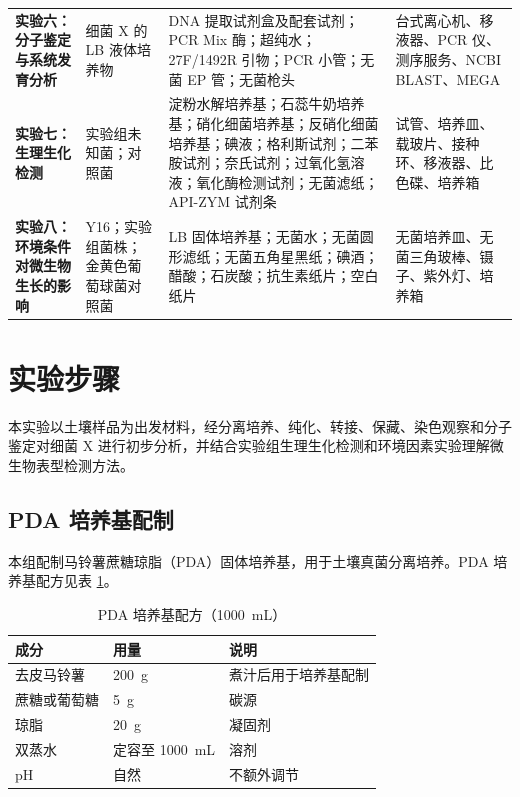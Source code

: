 \documentclass[UTF8,a4paper,12pt,fontset=none]{ctexart}
\numberwithin{figure}{section}
\begin{document}
\begin{longtable}{@{}C{0.12\textwidth}C{0.18\textwidth}C{0.35\textwidth}C{0.25\textwidth}@{}}
    \textbf{实验六：分子鉴定与系统发育分析}
    & 细菌 X 的 LB 液体培养物
    & DNA 提取试剂盒及配套试剂；PCR Mix 酶；超纯水；27F/1492R 引物；PCR 小管；无菌 EP 管；无菌枪头
    & 台式离心机、移液器、PCR 仪、测序服务、NCBI BLAST、MEGA \\
    \addlinespace[0.45em]
    \midrule

    \textbf{实验七：生理生化检测}
    & 实验组未知菌；对照菌
    & 淀粉水解培养基；石蕊牛奶培养基；硝化细菌培养基；反硝化细菌培养基；碘液；格利斯试剂；二苯胺试剂；奈氏试剂；过氧化氢溶液；氧化酶检测试剂；无菌滤纸；API-ZYM 试剂条
    & 试管、培养皿、载玻片、接种环、移液器、比色碟、培养箱 \\
    \addlinespace[0.45em]
    \midrule

    \textbf{实验八：环境条件对微生物生长的影响}
    & Y16；实验组菌株；金黄色葡萄球菌对照菌
    & LB 固体培养基；无菌水；无菌圆形滤纸；无菌五角星黑纸；碘酒；醋酸；石炭酸；抗生素纸片；空白纸片
    & 无菌培养皿、无菌三角玻棒、镊子、紫外灯、培养箱 \\
\end{longtable}
\endgroup

\newpage

\section{实验步骤}

本实验以土壤样品为出发材料，经分离培养、纯化、转接、保藏、染色观察和分子鉴定对细菌 X 进行初步分析，并结合实验组生理生化检测和环境因素实验理解微生物表型检测方法。

\subsection{PDA 培养基配制}

本组配制马铃薯蔗糖琼脂（PDA）固体培养基，用于土壤真菌分离培养。PDA 培养基配方见表 \ref{tab:pda_recipe}。

\begin{table}[H]
    \centering
    \caption{PDA 培养基配方（\SI{1000}{mL}）}
    \begin{tabular}{lll}
        \toprule
        \textbf{成分} & \textbf{用量} & \textbf{说明} \\
        \midrule
        去皮马铃薯 & \SI{200}{g} & 煮汁后用于培养基配制 \\
        蔗糖或葡萄糖 & \SI{5}{g} & 碳源 \\
        琼脂 & \SI{20}{g} & 凝固剂 \\
        双蒸水 & 定容至 \SI{1000}{mL} & 溶剂 \\
        pH & 自然 & 不额外调节 \\
        \bottomrule
    \end{tabular}
    \label{tab:pda_recipe}
\end{table}
\end{document}
